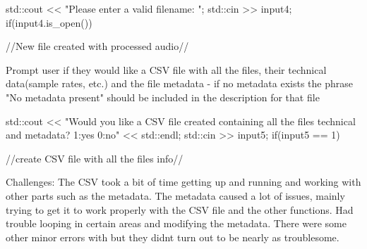 \begin{DoxyVerb}
    std::cout << "Please enter a valid filename: ";
    std::cin >> input4;
    if(input4.is_open()){

        //New file created with processed audio//

    }

Prompt user if they would like a CSV file with all the files, their technical data(sample rates, etc.) and the file metadata 
    - if no metadata exists the phrase "No metadata present" should be included in the description for that file

    std::cout << "Would you like a CSV file created containing all the files technical and metadata? 1:yes 0:no" << std::endl;
    std::cin >> input5;
    if(input5 == 1){

        //create CSV file with all the files info//

    }
\end{DoxyVerb}
 Challenges\+: The CSV took a bit of time getting up and running and working with other parts such as the metadata. The metadata caused a lot of issues, mainly trying to get it to work properly with the CSV file and the other functions. Had trouble looping in certain areas and modifying the metadata. There were some other minor errors with but they didn\textquotesingle{}t turn out to be nearly as troublesome. 